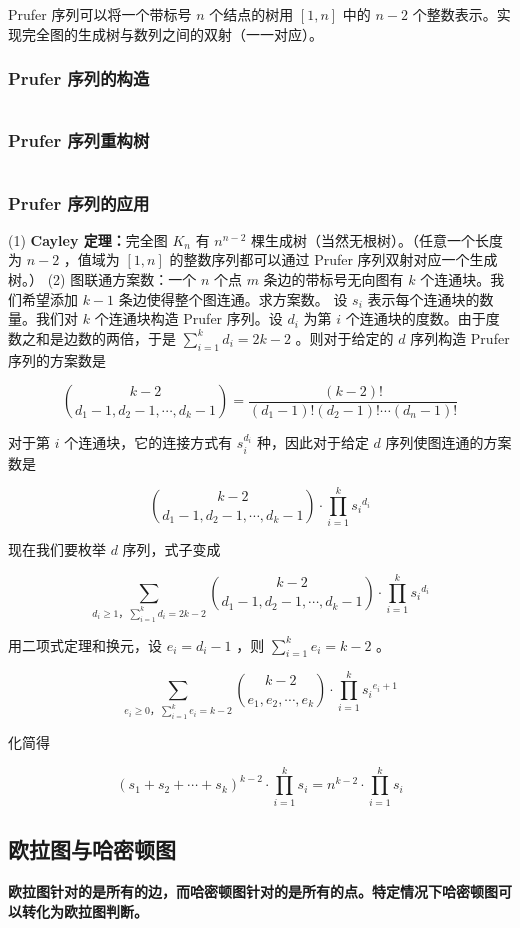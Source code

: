 \documentclass[a4paper,11pt]{article}
\begin{document}
Prufer 序列可以将一个带标号 \(n\) 个结点的树用 \([1,n]\) 中的 \(n-2\)
个整数表示。实现完全图的生成树与数列之间的双射（一一对应）。

\subsubsection{Prufer 序列的构造}
\inputminted[linenos]{c++}{graph/pruferbuild.cpp}
\subsubsection{Prufer 序列重构树}
\inputminted[linenos]{c++}{graph/prufertree.cpp}
\subsubsection{Prufer 序列的应用}
(1) \textbf{Cayley 定理：}完全图 \(K_n\) 有 \(n^{n-2}\)
棵生成树（当然无根树）。（任意一个长度为 \(n-2\) ，值域为 \([1,n]\)
的整数序列都可以通过 Prufer 序列双射对应一个生成树。）
(2) 图联通方案数：一个 \(n\) 个点 \(m\) 条边的带标号无向图有 \(k\)
个连通块。我们希望添加 \(k-1\) 条边使得整个图连通。求方案数。
设 \(s_i\) 表示每个连通块的数量。我们对 \(k\) 个连通块构造 Prufer
序列。设 \(d_i\) 为第 \(i\)
个连通块的度数。由于度数之和是边数的两倍，于是
\(\sum_{i=1}^{k}{d_i=2k-2}\) 。则对于给定的 \(d\) 序列构造 Prufer
序列的方案数是

\[\binom{k-2}{d_1-1,d_2-1,\cdots,d_k-1}=\frac{(k-2)!}{(d_1-1)!(d_2-1)!\cdots(d_n-1)!}\]

对于第 \(i\) 个连通块，它的连接方式有 \(s_i^{d_i}\) 种，因此对于给定
\(d\) 序列使图连通的方案数是

\[\binom{k-2}{d_1-1,d_2-1,\cdots,d_k-1}\cdot \prod_{i=1}^k{s_i}^{d_i}\]

现在我们要枚举 \(d\) 序列，式子变成

\[\sum_{d_i\ge 1，\sum_{i=1}^kd_i=2k-2}\binom{k-2}{d_1-1,d_2-1,\cdots,d_k-1}\cdot \prod_{i=1}^k{s_i}^{d_i}\]

用二项式定理和换元，设 \(e_i=d_i-1\) ，则 \(\sum_{i=1}^{k}e_i=k-2\) 。

\[\sum_{e_i\ge 0，\sum_{i=1}^ke_i=k-2}\binom{k-2}{e_1,e_2,\cdots,e_k}\cdot \prod_{i=1}^k{s_i}^{e_i+1}\]

化简得

\[(s_1+s_2+\cdots+s_k)^{k-2}\cdot \prod_{i=1}^ks_i=n^{k-2}\cdot\prod_{i=1}^ks_i\]
\subsection{欧拉图与哈密顿图}
\textbf{欧拉图针对的是所有的边，而哈密顿图针对的是所有的点。特定情况下哈密顿图可以转化为欧拉图判断。}
\end{document}
